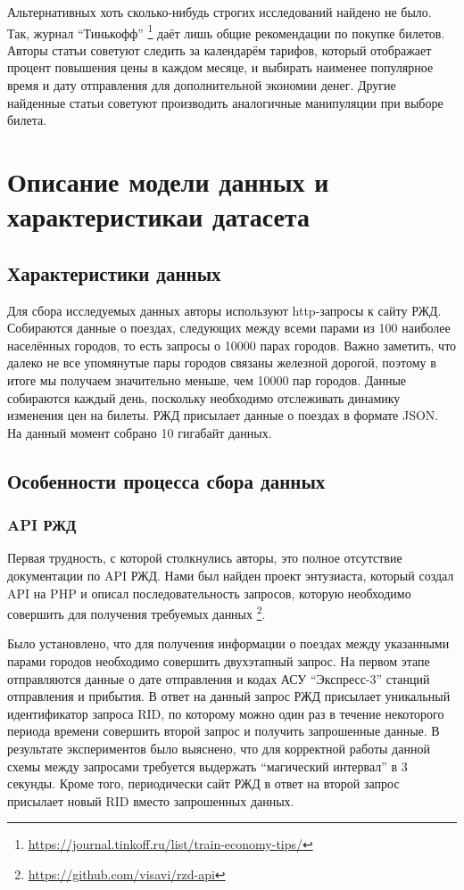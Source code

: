 \documentclass[conference]{IEEEtran}
\begin{document}
Альтернативных хоть сколько-нибудь строгих исследований найдено не было. Так, журнал ``Тинькофф'' \footnote{\href{https://journal.tinkoff.ru/list/train-economy-tips/}{https://journal.tinkoff.ru/list/train-economy-tips/}}
даёт лишь общие рекомендации по покупке билетов. Авторы статьи советуют следить за календарём тарифов, который отображает процент повышения цены в каждом месяце, и выбирать наименее популярное время и дату отправления для дополнительной экономии денег. Другие найденные статьи советуют производить аналогичные манипуляции при выборе билета.

\section{Описание модели данных и характеристикаи датасета}
\subsection{Характеристики данных}

Для сбора исследуемых данных авторы используют http-запросы к сайту РЖД. Собираются данные о поездах, следующих между всеми парами из 100 наиболее населённых городов, то есть запросы о 10000 парах городов. Важно заметить, что далеко не все упомянутые пары городов связаны железной дорогой, поэтому в итоге мы получаем значительно меньше, чем 10000 пар городов. Данные собираются каждый день, поскольку необходимо отслеживать динамику изменения цен на билеты. РЖД присылает данные о поездах в формате JSON. На данный момент собрано 10
гигабайт данных.

\subsection{Особенности процесса сбора данных}

\subsubsection{API РЖД}
Первая трудность, с которой столкнулись авторы, это полное отсутствие документации по API РЖД. Нами был найден проект энтузиаста, который создал API на PHP и описал последовательность запросов, которую необходимо совершить для получения требуемых данных \footnote{\href{https://github.com/visavi/rzd-api}{https://github.com/visavi/rzd-api}}.

Было установлено, что для получения информации о поездах между указанными парами городов необходимо совершить двухэтапный запрос. На первом этапе отправляются данные о дате отправления и кодах АСУ ``Экспресс-3'' станций отправления и прибытия. В ответ на данный запрос РЖД присылает уникальный идентификатор запроса RID, по которому можно один раз в течение некоторого периода времени совершить второй запрос и получить запрошенные данные. В результате экспериментов было выяснено, что для корректной работы данной схемы между запросами требуется выдержать ``магический интервал'' в 3 секунды. Кроме того, периодически сайт РЖД в ответ на второй запрос присылает новый RID вместо запрошенных данных.
\end{document}
